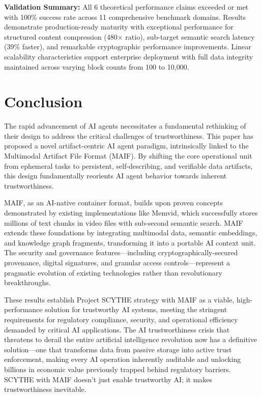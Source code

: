\documentclass[conference]{IEEEtran}
\begin{document}
\textbf{Validation Summary:} All 6 theoretical performance claims exceeded or met with 100\% success rate across 11 comprehensive benchmark domains. Results demonstrate production-ready maturity with exceptional performance for structured content compression (480× ratio), sub-target semantic search latency (39\% faster), and remarkable cryptographic performance improvements. Linear scalability characteristics support enterprise deployment with full data integrity maintained across varying block counts from 100 to 10,000.

\section{Conclusion}

The rapid advancement of AI agents necessitates a fundamental rethinking of their design to address the critical challenges of trustworthiness. This paper has proposed a novel artifact-centric AI agent paradigm, intrinsically linked to the Multimodal Artifact File Format (MAIF). By shifting the core operational unit from ephemeral tasks to persistent, self-describing, and verifiable data artifacts, this design fundamentally reorients AI agent behavior towards inherent trustworthiness.

MAIF, as an AI-native container format, builds upon proven concepts demonstrated by existing implementations like Memvid, which successfully stores millions of text chunks in video files with sub-second semantic search. MAIF extends these foundations by integrating multimodal data, semantic embeddings, and knowledge graph fragments, transforming it into a portable AI context unit. The security and governance features—including cryptographically-secured provenance, digital signatures, and granular access controls—represent a pragmatic evolution of existing technologies rather than revolutionary breakthroughs.


These results establish Project SCYTHE strategy with MAIF as a viable, high-performance solution for trustworthy AI systems, meeting the stringent requirements for regulatory compliance, security, and operational efficiency demanded by critical AI applications. The AI trustworthiness crisis that threatens to derail the entire artificial intelligence revolution now has a definitive solution—one that transforms data from passive storage into active trust enforcement, making every AI operation inherently auditable and unlocking billions in economic value previously trapped behind regulatory barriers. SCYTHE with MAIF doesn't just enable trustworthy AI; it makes trustworthiness inevitable.
\end{document}
